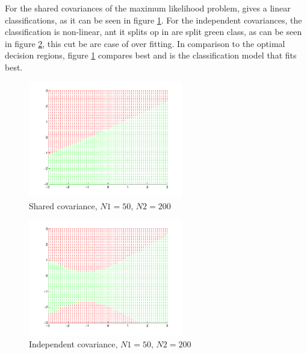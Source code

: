 For the shared covariances of the maximum likelihood problem, gives a
linear classifications, as it can be seen in
figure \ref{fig:q24a}. For the independent covariances, the
classification is non-linear, ant it splits op in are split green
class, as can be seen in figure
\ref{fig:q24b}, this cut be are case of over fitting. In comparison to
the optimal decision regions, figure \ref{fig:q24a} compares best and is
the classification model that fits best.

\begin{figure}[!htbp]
  \centering
  \includegraphics[width=0.6\textwidth]{./images/q24a.pdf}
  \caption{Shared covariance, $N1 = 50$, $N2= 200$}
  \label{fig:q24a}
\end{figure}

\begin{figure}[!htbp]
  \centering
  \includegraphics[width=0.6\textwidth]{./images/q24b.pdf}
  \caption{Independent covariance, $N1 = 50$, $N2= 200$}
  \label{fig:q24b}
\end{figure}

